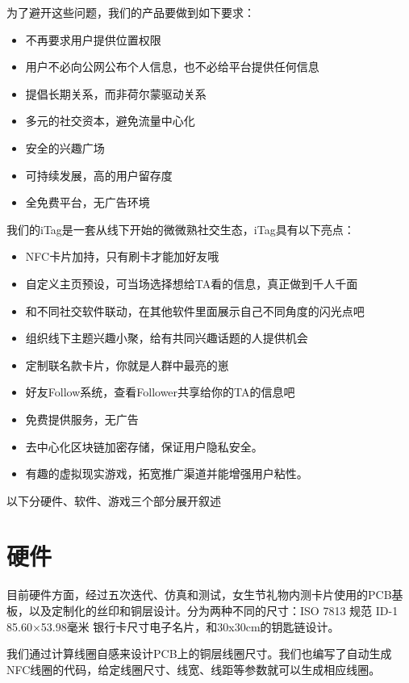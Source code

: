 \documentclass[UTF8]{ctexart}
\begin{document}
为了避开这些问题，我们的产品要做到如下要求：

\begin{itemize}
    \item 不再要求用户提供位置权限
    \item 用户不必向公网公布个人信息，也不必给平台提供任何信息
    \item 提倡长期关系，而非荷尔蒙驱动关系
    \item 多元的社交资本，避免流量中心化
    \item 安全的兴趣广场
    \item 可持续发展，高的用户留存度
    \item 全免费平台，无广告环境
\end{itemize}

我们的iTag是一套从线下开始的微微熟社交生态，iTag具有以下亮点：

\begin{itemize}
    \item NFC卡片加持，只有刷卡才能加好友哦
    \item 自定义主页预设，可当场选择想给TA看的信息，真正做到千人千面
    \item 和不同社交软件联动，在其他软件里面展示自己不同角度的闪光点吧
    \item 组织线下主题兴趣小聚，给有共同兴趣话题的人提供机会
    \item 定制联名款卡片，你就是人群中最亮的崽
    \item 好友Follow系统，查看Follower共享给你的TA的信息吧~
    \item 免费提供服务，无广告
    \item 去中心化区块链加密存储，保证用户隐私安全。
    \item 有趣的虚拟现实游戏，拓宽推广渠道并能增强用户粘性。
\end{itemize}

以下分硬件、软件、游戏三个部分展开叙述

\section{硬件}

目前硬件方面，经过五次迭代、仿真和测试，女生节礼物内测卡片使用的PCB基板，以及定制化的丝印和铜层设计。分为两种不同的尺寸：ISO 7813 规范 ID-1 85.60×53.98毫米 银行卡尺寸电子名片，和30x30cm的钥匙链设计。

我们通过计算线圈自感来设计PCB上的铜层线圈尺寸。我们也编写了自动生成NFC线圈的代码，给定线圈尺寸、线宽、线距等参数就可以生成相应线圈。
\end{document}
